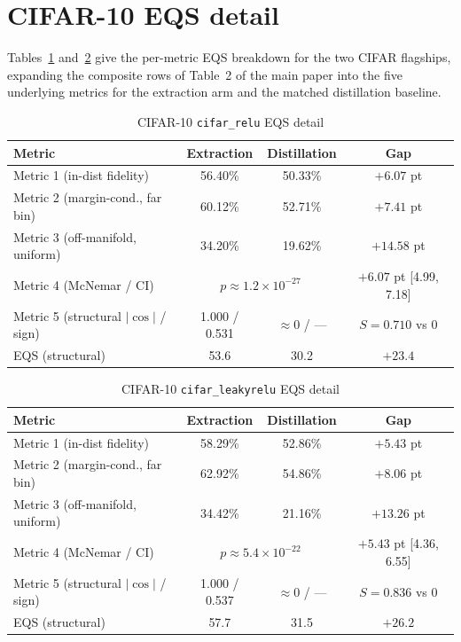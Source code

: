 \documentclass[runningheads,orivec]{llncs}
\begin{document}
\section{CIFAR-10 EQS detail}
\label{app:exp:cifar-eqs}
Tables~\ref{tab:cifar-eqs} and~\ref{tab:cifar-eqs-leaky} give the per-metric EQS breakdown for the two CIFAR flagships, expanding the composite rows of Table~2 of the main paper into the five underlying metrics for the extraction arm and the matched distillation baseline.

\begin{table}[H]
\centering
\caption{CIFAR-10 \texttt{cifar\_relu} EQS detail}
\label{tab:cifar-eqs}
\begin{tabular}{lccc}
\toprule
Metric & Extraction & Distillation & Gap \\
\midrule
Metric 1 (in-dist fidelity)    & 56.40\% & 50.33\% & $+6.07$ pt \\
Metric 2 (margin-cond., far bin) & 60.12\% & 52.71\% & $+7.41$ pt \\
Metric 3 (off-manifold, uniform) & 34.20\% & 19.62\% & $+14.58$ pt \\
Metric 4 (McNemar / CI)        & \multicolumn{2}{c}{$p\approx1.2\times10^{-27}$} & $+6.07$ pt [4.99, 7.18] \\
Metric 5 (structural $|\cos|$ / sign) & 1.000 / 0.531 & $\approx 0$ / --- & $S=0.710$ vs $0$ \\
\midrule
EQS (structural)               & 53.6 & 30.2 & $+23.4$ \\
\bottomrule
\end{tabular}
\end{table}

\begin{table}[H]
\centering
\caption{CIFAR-10 \texttt{cifar\_leakyrelu} EQS detail}
\label{tab:cifar-eqs-leaky}
\begin{tabular}{lccc}
\toprule
Metric & Extraction & Distillation & Gap \\
\midrule
Metric 1 (in-dist fidelity)    & 58.29\% & 52.86\% & $+5.43$ pt \\
Metric 2 (margin-cond., far bin) & 62.92\% & 54.86\% & $+8.06$ pt \\
Metric 3 (off-manifold, uniform) & 34.42\% & 21.16\% & $+13.26$ pt \\
Metric 4 (McNemar / CI)        & \multicolumn{2}{c}{$p\approx5.4\times10^{-22}$} & $+5.43$ pt [4.36, 6.55] \\
Metric 5 (structural $|\cos|$ / sign) & 1.000 / 0.537 & $\approx 0$ / --- & $S=0.836$ vs $0$ \\
\midrule
EQS (structural)               & 57.7 & 31.5 & $+26.2$ \\
\bottomrule
\end{tabular}
\end{table}
\end{document}

